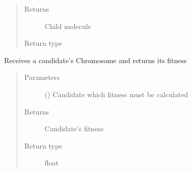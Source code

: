\documentclass[letterpaper,10pt,english]{sphinxmanual}
\begin{document}
\begin{fulllineitems}
\begin{fulllineitems}
\begin{quote}
\begin{description}
\begin{itemize}
\end{itemize}

\item[{Returns}] \leavevmode
\sphinxAtStartPar
Child molecule

\item[{Return type}] \leavevmode
\sphinxAtStartPar
{\hyperref[\detokenize{molecular:molecular.Molecule}]{}}

\end{description}\end{quote}

\end{fulllineitems}


\begin{fulllineitems}
\label{\detokenize{MolOpt:MolOpt.MolOpt.get_fitness}}
\sphinxAtStartPar
Receives a candidate’s Chromosome and returns its fitness
\begin{quote}\begin{description}
\item[{Parameters}] \leavevmode
\sphinxAtStartPar
{} ({\hyperref[\detokenize{genetic:genetic.Chromosome}]{}}) \textendash{} Candidate which fitness must be calculated

\item[{Returns}] \leavevmode
\sphinxAtStartPar
Candidate’s fitness

\item[{Return type}] \leavevmode
\sphinxAtStartPar
float

\end{description}\end{quote}

\end{fulllineitems}



\end{fulllineitems}
\end{document}

